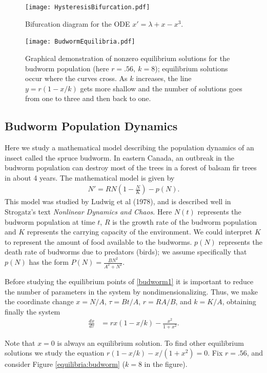 \begin{figure}
\centering
\texttt{[image: HysteresisBifurcation.pdf]}
\caption{Bifurcation diagram for the ODE $x' = \lambda + x - x^3$. }
\label{bifurcation:hysteresis}
\end{figure}

\begin{figure}
\centering
\texttt{[image: BudwormEquilibria.pdf]}
\caption{Graphical demonstration of nonzero equilibrium solutions for the budworm population (here $r = .56,\ k=8$); equilibrium solutions occur where the curves cross.
As $k$ increases, the line $y=r(1- x/k)$ gets more shallow and the number of solutions goes from one to three and then back to one. }
\label{equilibria:budworm}
\end{figure}

\subsection*{Budworm Population Dynamics}
Here we study a mathematical model describing the population dynamics of an insect called the spruce budworm.
In eastern Canada, an outbreak in the budworm population can destroy most of the trees in a forest of balsam fir trees in about 4 years.
The mathematical model is given by
\begin{align}
N' = RN\left(1 - \frac{N}{K}\right) - p(N). \label{budworm1}
\end{align}
This model was studied by Ludwig et al (1978), and is described well in Strogatz's text \emph{Nonlinear Dynamics and Chaos}.
Here $N(t)$ represents the budworm population at time $t$, $R$ is the growth rate of the budworm population and $K$ represents the carrying capacity of the environment.
We could interpret $K$ to represent the amount of food available to the budworms.
$p(N)$ represents the death rate of budworms due to predators (birds); we assume specifically that $p(N)$ has the form $P(N) = \frac{BN^2}{A^2 + N^2}$.

Before studying the equilibrium points of \eqref{budworm1} it is important to reduce the number of parameters in the system by nondimensionalizing.
Thus, we make the coordinate change $x = N/A$, $\tau = Bt/A$, $r = RA/B$, and $k = K/A$, obtaining finally the system
\begin{align}
	\frac{dx}{d \tau} &= rx(1-x/k) - \frac{x^2}{1+x^2}.
\end{align}

Note that $x = 0$ is always an equilibrium solution.
To find other equilibrium solutions we study the equation $r(1-x/k)-x/(1+x^2) = 0$.
Fix $r = .56$, and consider Figure \eqref{equilibria:budworm} ($k=8$ in the figure).

